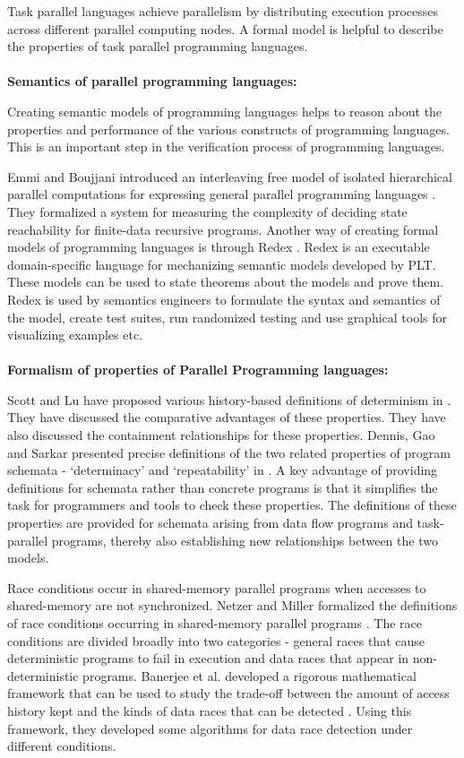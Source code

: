 Task parallel languages achieve parallelism by distributing execution processes across different parallel computing nodes. A formal model is helpful to describe the properties of task parallel programming languages. 
\\
\\
\textbf{Semantics of parallel programming languages:} 

Creating semantic models of programming languages helps to reason about the properties and performance of the various constructs of programming languages. This is an important step in the verification process of programming languages.

Emmi and Boujjani introduced an interleaving free model of isolated hierarchical parallel computations for expressing general parallel programming languages \cite{bouajjani2012analysis}. They formalized a system for measuring the complexity of deciding state reachability for finite-data recursive programs. Another way of creating formal models of programming languages is through Redex \cite{klein2012run}. Redex is an executable domain-specific language for mechanizing semantic models developed by PLT. These models can be used to state theorems about the models and prove them. Redex is used by semantics engineers to formulate the syntax and semantics of the model, create test suites, run randomized testing and use graphical tools for visualizing examples etc.
\\
\\
\textbf{Formalism of properties of Parallel Programming languages:}

Scott and Lu have proposed various history-based definitions of determinism in \cite{lu2011toward}. They have discussed the comparative advantages of these properties. They have also discussed the containment relationships for these properties. Dennis, Gao and Sarkar presented precise definitions of the two related properties of program schemata - ‘determinacy’ and ‘repeatability’ in \cite{dennis2012determinacy}. A key advantage of providing definitions for schemata rather than concrete programs is that it simplifies the task for programmers and tools to check these properties. The definitions of these properties are provided for schemata arising from data flow programs and task-parallel programs, thereby also establishing new relationships between the two models.

Race conditions occur in shared-memory parallel programs when accesses to shared-memory are not synchronized. Netzer and Miller formalized the definitions of  race conditions occurring in shared-memory parallel programs \cite{netzer1992race}. The race conditions are divided broadly into two categories - general races that cause deterministic programs to fail in execution and data races that appear in non-deterministic programs. Banerjee et al. developed a rigorous mathematical framework that can be used to study the trade-off between the amount of access history kept and the kinds of data races that can be detected \cite{banerjee2006theory}. Using this framework, they developed some algorithms for data race detection under different conditions.


